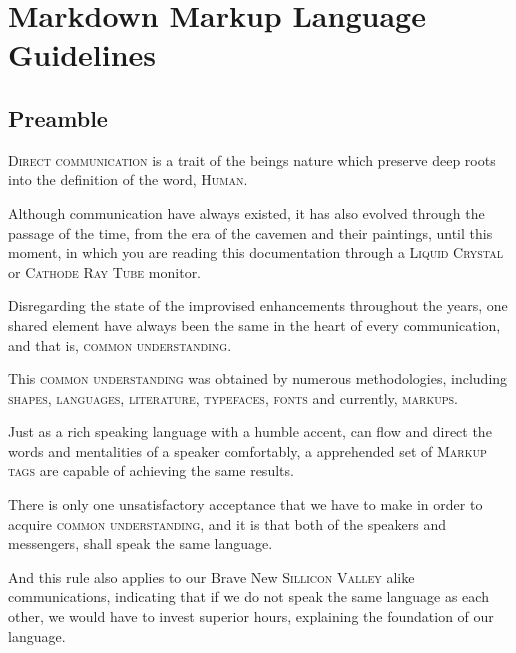 \documentclass[13pt]{scrarticle}
\newcommand{\header}[1]{ \textsf{#1} \relax{}}
\newcommand{\name}[1]{{\textsc{#1}}}
\begin{document}
    \newpage
    \section{\header{Markdown Markup Language Guidelines}}
    \subsection{\header{Preamble}}


    \name{Direct communication} is a trait of the beings nature
    which preserve deep roots into the definition of the word,
    \name{Human}. \newline

    Although communication have always existed,
    it has also evolved through the passage of the time,
    from the era of the cavemen and their paintings,
    until this moment,
    in which you are reading this documentation through a \name{Liquid Crystal} or \name{Cathode Ray Tube} monitor. \newline

    Disregarding the state of the improvised enhancements throughout the years,
    one shared element have always been the same in the heart of every communication,
    and that is, \name{common understanding}. \newline

    This \name{common understanding} was obtained by numerous methodologies,
    including \name{shapes}, \name{languages}, \name{literature}, \name{typefaces}, \name{fonts} and currently, \name{markups}. \newline

    Just as a rich speaking language with a humble accent, can flow and direct the words and mentalities of a speaker comfortably,
    a apprehended set of \name{Markup tags} are capable of achieving the same results. \newline


    \newpage
    There is only one unsatisfactory acceptance that we have to make in order to acquire
    \name{common understanding}, and it is that both of the speakers and messengers, shall speak the same language. \newline

    And this rule also applies to our Brave New \name{Sillicon Valley} alike communications,
    indicating that if we do not speak the same language as each other,
    we would have to invest superior hours, explaining the foundation of our language. \newline
\end{document}
